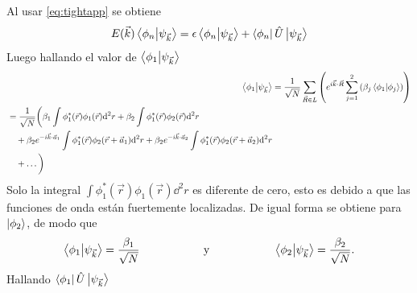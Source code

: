 Al usar \eqref{eq:tightapp} se obtiene
\begin{equation}
	E(\vec{k}) \braket{\phi_n}{\psi_{\vec{k}}} = \epsilon \braket{\phi_n}{\psi_{\vec{k}}} + \bra{\phi_n}\hat{U}\ket{\psi_{\vec{k}}}\label{eq:waveTight}
\end{equation}
Luego hallando el valor de $\braket{\phi_1}{\psi_{\vec{k}}}$
\begin{align}
	\nonumber \braket{\phi_1}{\psi_{\vec{k}}} & = \frac{1}{\sqrt{N}}\sum_{\vec{R}\in L}\left(e^{i \vec{k}\cdot \vec{R}}\sum_{j=1}^{2}\left(\beta_j\bra{\phi_1}\ket{\phi_j}\right)\right)                                                                                                                                                                                                                                                                                                                                                                            \\
		\begin{split}
              & = \frac{1}{\sqrt{N}}\bigg(\beta_1 \int \phi_1^{\ast}(\vec{r})\phi_1(\vec{r}) \dd^2 r +\beta_2 \int \phi_1^{\ast}(\vec{r})\phi_2(\vec{r}) \dd^2 r \\&\quad  + \beta_2 e^{-i \vec{k}\cdot \vec{a}_1}\int \phi_1^{\ast}(\vec{r})\phi_2(\vec{r}+\vec{a}_1) \dd^2 r+ \beta_2 e^{-i \vec{k}\cdot \vec{a}_2}\int \phi_1^{\ast}(\vec{r})\phi_2(\vec{r}+\vec{a}_2) \dd^2 r\\&\quad + \ldots\bigg)
	          \end{split} 
\end{align}
Solo la integral $\int \phi_1^{\ast}(\vec{r})\phi_1(\vec{r})\dd^2r$ es diferente de cero, esto es debido a que las funciones de onda están fuertemente localizadas. De igual forma se obtiene para $\ket{\phi_2}$, de modo que
\begin{equation}
  \braket{\phi_1}{\psi_{\vec{k}}} = \frac{\beta_1}{\sqrt{N}}\hspace{2cm}\text{y}\hspace{2cm}\braket{\phi_2}{\psi_{\vec{k}}} = \frac{\beta_2}{\sqrt{N}}.
\end{equation}
Hallando $\bra{\phi_1} \hat{U} \ket{\psi_{\vec{k}}}$
